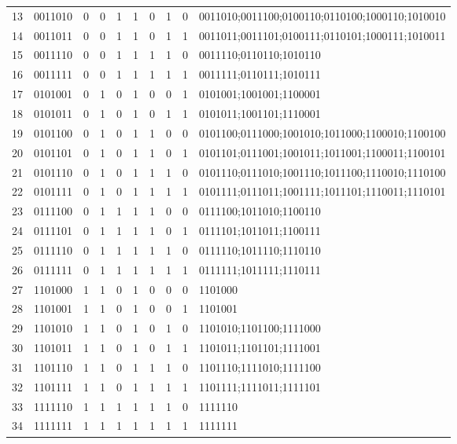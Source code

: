 \documentclass[a4paper]{article}
\begin{document}
\begin{Schunk}
\begin{table}[ht]
\begin{center}
{\begin{tabular}{rlrrrrrrrl}
  13 & 0011010 & 0 & 0 & 1 & 1 & 0 & 1 & 0 & 0011010;0011100;0100110;0110100;1000110;1010010 \\
  14 & 0011011 & 0 & 0 & 1 & 1 & 0 & 1 & 1 & 0011011;0011101;0100111;0110101;1000111;1010011 \\
  15 & 0011110 & 0 & 0 & 1 & 1 & 1 & 1 & 0 & 0011110;0110110;1010110 \\
  16 & 0011111 & 0 & 0 & 1 & 1 & 1 & 1 & 1 & 0011111;0110111;1010111 \\
  17 & 0101001 & 0 & 1 & 0 & 1 & 0 & 0 & 1 & 0101001;1001001;1100001 \\
  18 & 0101011 & 0 & 1 & 0 & 1 & 0 & 1 & 1 & 0101011;1001101;1110001 \\
  19 & 0101100 & 0 & 1 & 0 & 1 & 1 & 0 & 0 & 0101100;0111000;1001010;1011000;1100010;1100100 \\
  20 & 0101101 & 0 & 1 & 0 & 1 & 1 & 0 & 1 & 0101101;0111001;1001011;1011001;1100011;1100101 \\
  21 & 0101110 & 0 & 1 & 0 & 1 & 1 & 1 & 0 & 0101110;0111010;1001110;1011100;1110010;1110100 \\
  22 & 0101111 & 0 & 1 & 0 & 1 & 1 & 1 & 1 & 0101111;0111011;1001111;1011101;1110011;1110101 \\
  23 & 0111100 & 0 & 1 & 1 & 1 & 1 & 0 & 0 & 0111100;1011010;1100110 \\
  24 & 0111101 & 0 & 1 & 1 & 1 & 1 & 0 & 1 & 0111101;1011011;1100111 \\
  25 & 0111110 & 0 & 1 & 1 & 1 & 1 & 1 & 0 & 0111110;1011110;1110110 \\
  26 & 0111111 & 0 & 1 & 1 & 1 & 1 & 1 & 1 & 0111111;1011111;1110111 \\
  27 & 1101000 & 1 & 1 & 0 & 1 & 0 & 0 & 0 & 1101000 \\
  28 & 1101001 & 1 & 1 & 0 & 1 & 0 & 0 & 1 & 1101001 \\
  29 & 1101010 & 1 & 1 & 0 & 1 & 0 & 1 & 0 & 1101010;1101100;1111000 \\
  30 & 1101011 & 1 & 1 & 0 & 1 & 0 & 1 & 1 & 1101011;1101101;1111001 \\
  31 & 1101110 & 1 & 1 & 0 & 1 & 1 & 1 & 0 & 1101110;1111010;1111100 \\
  32 & 1101111 & 1 & 1 & 0 & 1 & 1 & 1 & 1 & 1101111;1111011;1111101 \\
  33 & 1111110 & 1 & 1 & 1 & 1 & 1 & 1 & 0 & 1111110 \\
  34 & 1111111 & 1 & 1 & 1 & 1 & 1 & 1 & 1 & 1111111 \\
   \hline
\end{tabular}
}
\end{center}
\end{table}\end{Schunk}
\end{document}
